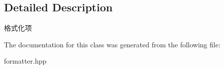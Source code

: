 \subsection{Detailed Description}
格式化项 

The documentation for this class was generated from the following file\+:\begin{DoxyCompactItemize}
\item 
formatter.\+hpp\end{DoxyCompactItemize}
